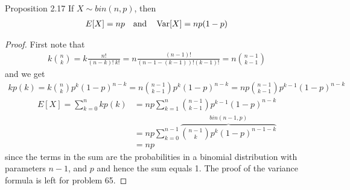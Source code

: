 \begin{boks}{Proposition 2.17}
  If $X \sim bin(n, p)$, then
  \begin{align*}
    E[X] = np \quad \text{and} \quad \operatorname{Var}[X] = np(1 - p)
  \end{align*}
\end{boks}
\begin{proof}
  First note that
  \begin{align*}
    k \binom{n}{k}  = k \frac{n!}{(n - k)! \ k!}
                    = n \frac{(n - 1)!}{(n - 1 - (k - 1))! (k - 1)!}
                    = n \binom{n - 1}{k - 1}
  \end{align*}
  and we get
  \begin{align*}
    k p(k)  = k \binom{n}{k} p^k (1 - p)^{n - k}
            = n \binom{n - 1}{k - 1} p^k (1 - p)^{n - k}
            = np \binom{n - 1}{k - 1} p^{k - 1} (1 - p)^{n - k}
  \end{align*}
  \begin{align*}
    E[X] = \sum_{k = 0}^n kp(k) &= np \sum_{k = 1}^n \binom{n - 1}{k - 1}p^{k - 1}(1 - p)^{n - k}\\
    &= np \sum_{k = 0}^{n - 1} \overbrace{\binom{n - 1}{k} p^k (1 - p)^{n - 1 - k}}^{bin(n - 1, p)} \\
    &= np
  \end{align*}
  since the terms in the sum are the probabilities in a binomial distribution with parameters $n - 1$, and $p$ and hence the sum equals 1.
  The proof of the variance formula is left for problem 65.
\end{proof}
